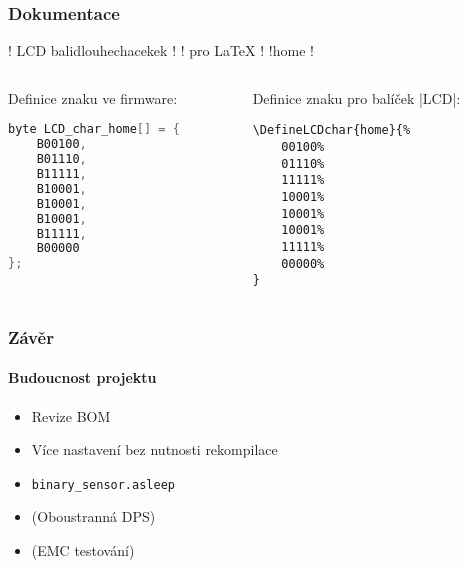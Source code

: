\documentclass[
    utf8,
    aspectratio=169,
    17pt,  %
]{beamer}
\begin{document}
\begin{frame}[fragile] %
    \frametitle{Dokumentace}
    \begin{center}
        \hfill
        !  LCD bal{idlouhe}{chacek}ek   !
                   !   pro LaTeX    !
        \hfill
        {
            \huge
            !{home} !
        }
        \hfill~
    \end{center}

    \begin{columns}
        \begin{column}{0.4\textwidth}
            \footnotesize
            Definice znaku ve firmware:
            \begin{lstlisting}[language=C++]
byte LCD_char_home[] = {
    B00100,
    B01110,
    B11111,
    B10001,
    B10001,
    B10001,
    B11111,
    B00000
};
            \end{lstlisting}
        \end{column}
        \begin{column}{0.4\textwidth}
            \footnotesize
            Definice znaku pro balíček |LCD|:
            \begin{lstlisting}[language={[LaTeX]TeX}]
\DefineLCDchar{home}{%
    00100%
    01110%
    11111%
    10001%
    10001%
    10001%
    11111%
    00000%
}
            \end{lstlisting}
        \end{column}
    \end{columns}
\end{frame}

\begin{frame}[fragile]
    \frametitle{Závěr}
    \framesubtitle{Budoucnost projektu}
    \begin{itemize}
        \item Revize BOM
        \item Více nastavení bez nutnosti rekompilace
        \item \verb|binary_sensor.asleep|
        \item (Oboustranná DPS)
        \item (EMC testování)
    \end{itemize}
\end{frame}
\end{document}
